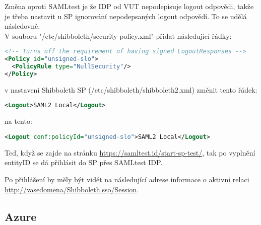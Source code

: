 Změna oproti SAMLtest je že IDP od VUT nepodepisuje logout odpovědi, takže je třeba nastavit u SP ignorování nepodepsaných logout odpovědí. To se udělá následovně.\\
V souboru  "/etc/shibboleth/security-policy.xml" přidat následující řádky:
\begin{lstlisting}[language=XML]
<!-- Turns off the requirement of having signed LogoutResponses -->
<Policy id="unsigned-slo">
  <PolicyRule type="NullSecurity"/>
</Policy>
\end{lstlisting}

 v nastavení Shibboleth SP (/etc/shibboleth/shibboleth2.xml)
 změnit tento řádek:
 \begin{lstlisting}[language=XML]
 <Logout>SAML2 Local</Logout>
\end{lstlisting}
na tento:
 \begin{lstlisting}[language=XML]
 <Logout conf:policyId="unsigned-slo">SAML2 Local</Logout>
\end{lstlisting}

Teď, když se zajde na stránku \url{https://samltest.id/start-sp-test/}, tak po vyplnění entityID se dá přihlásit do SP přes SAMLtest IDP.

Po přihlášení by měly být vidět na následující adrese informace o aktivní relaci \url{http://vasedomena/Shibboleth.sso/Session}.

\subsection{Azure}


